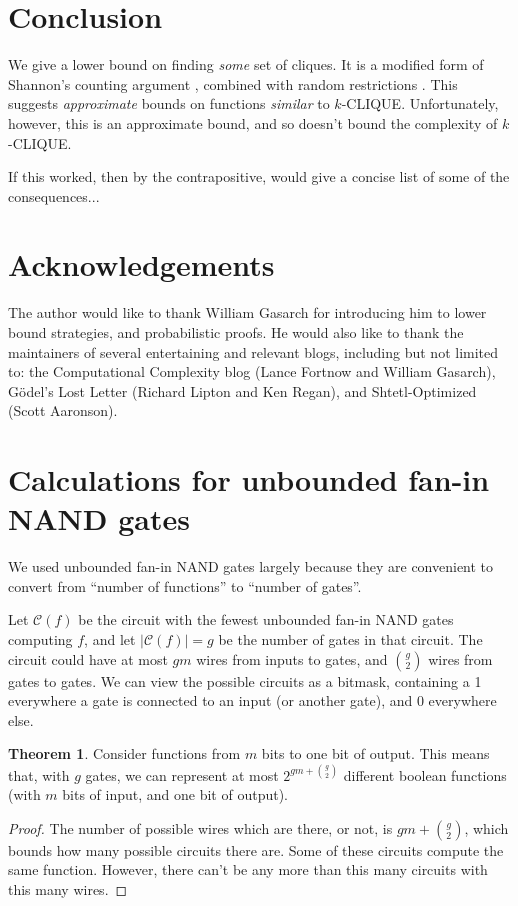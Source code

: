 \documentclass[12pt]{article}
\theoremstyle{definition}
\newtheorem{thm}{Theorem}[section]
\newcommand{\bigC}[0]{\mathcal{C}}
\begin{document}
\section{Conclusion}

We give a lower bound on finding {\em some} set of cliques.
It is a modified form of Shannon's counting argument
\cite{shannon_synthesis_1949}, combined with random restrictions
\cite{subbotovskaya1963comparison} \cite{hastad1987lower}.
This suggests {\em approximate} bounds on functions {\em similar} to $k$-CLIQUE.
Unfortunately, however, this is an approximate bound,
and so doesn't bound the complexity of $k$-CLIQUE.

If this worked, then by the contrapositive,
\cite{fenner1996complexity} would give a concise list of some of the consequences...

\section{Acknowledgements}

The author would like to thank William Gasarch for introducing him
to lower bound strategies, and probabilistic proofs.
He would also like to thank the maintainers of
several entertaining and relevant blogs, including but
not limited to: the Computational Complexity blog
(Lance Fortnow and William Gasarch), 
G\"odel's Lost Letter (Richard Lipton and Ken Regan),
and Shtetl-Optimized (Scott Aaronson). 


\appendix
\section{Calculations for unbounded fan-in NAND gates}
\label{gateMath}

We used unbounded fan-in NAND gates largely because they are
convenient to convert from ``number of functions'' to
``number of gates''.

Let $\bigC(f)$ be the circuit
with the fewest unbounded fan-in NAND
gates computing $f$, and let $|\bigC(f)| = g$ be the number of gates in
that circuit. The
circuit could have at most $gm$ wires from inputs to gates, and ${g \choose 2}$
wires from gates to gates. We can view the possible circuits as a bitmask,
containing a 1 everywhere a gate is connected to an input (or another gate),
and 0 everywhere else.

\begin{thm}
\label{boundFromCounting}
Consider functions from $m$ bits to one bit of output.
This means that, with $g$ gates, we can represent at most
$2^{gm + {g \choose 2}}$ different boolean functions (with $m$ bits of input,
and one bit of output).
\end{thm}
\begin{proof}

The number of possible wires which are there, or not, is $gm + {g \choose 2}$,
which bounds how many possible circuits there are.
Some of these circuits compute the same function.
However, there can't be any more than this many circuits with this many wires.
\end{proof}
\end{document}
